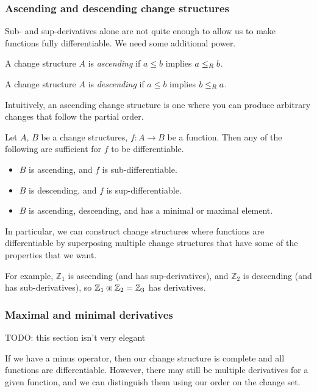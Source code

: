 \subsubsection{Ascending and descending change structures}

Sub- and sup-derivatives alone are not quite enough to allow us to make
functions fully differentiable. We need some additional power.

\begin{defn}
  A change structure $A$ is \textit{ascending} if $a \leq b$ implies $a
  \leq_R b$.

  A change structure $A$ is \textit{descending} if $a \leq b$ implies $b
  \leq_R a$.
\end{defn}

Intuitively, an ascending change structure is one where you can produce
arbitrary changes that follow the partial order.

\begin{thm}
  Let $A$, $B$ be a change structures, $f: A \rightarrow B$ be a function. Then
  any of the following are sufficient for $f$ to be differentiable.
  \begin{itemize}
    \item $B$ is ascending, and $f$ is sub-differentiable.
    \item $B$ is descending, and $f$ is sup-differentiable.
    \item $B$ is ascending, descending, and has a minimal or maximal element.
  \end{itemize}
\end{thm}

In particular, we can construct change structures where functions are
differentiable by superposing multiple change structures that have some of the
properties that we want.

For example, $\mathbb{Z}_1$ is ascending (and has sup-derivatives), and
$\mathbb{Z}_2$ is descending (and has sub-derivatives), so $\mathbb{Z}_1
\circledast \mathbb{Z}_2 = \mathbb{Z}_3$ has derivatives.

\subsubsection{Maximal and minimal derivatives}

TODO: this section isn't very elegant

If we have a minus operator, then our change structure is complete and all
functions are differentiable. However, there may still be multiple derivatives
for a given function, and we can distinguish them using our order on the change
set.

